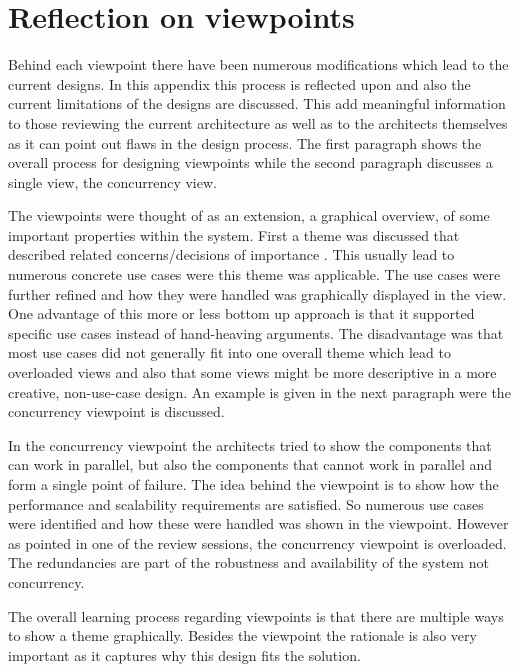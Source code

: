 \section{Reflection on viewpoints}

Behind each viewpoint there have been numerous modifications which lead to the current designs. In this appendix this process is reflected upon and also the current limitations of the designs are discussed. This add meaningful information to those reviewing the current architecture as well as to the architects themselves as it can point out flaws in the design process. The first paragraph shows the overall process for designing viewpoints while the second paragraph discusses a single view, the concurrency view. \newline

The viewpoints were thought of as an extension, a graphical overview, of some important properties within the system. First a theme was discussed that described related concerns/decisions of importance . This usually lead to numerous concrete use cases were this theme was applicable. The use cases were further refined and how they were handled was graphically displayed in the view. One advantage of this more or less bottom up approach is that it supported specific use cases instead of hand-heaving arguments. The disadvantage was that most use cases did not generally fit into one overall theme which lead to overloaded views and also that some views might be more descriptive in a more creative, non-use-case design. An example is given in the next paragraph were the concurrency viewpoint is discussed.\newline

In the concurrency viewpoint the architects tried to show the components that can work in parallel, but also the components that cannot work in parallel and form a single point of failure. The idea behind the viewpoint is to show how the performance and scalability requirements are satisfied. So numerous use cases were identified and how these were handled was shown in the viewpoint. However as pointed in one of the review sessions, the concurrency viewpoint is overloaded. The redundancies are part of the robustness and availability of the system not concurrency. \newline 

The overall learning process regarding viewpoints is that there are multiple ways to show a theme graphically. Besides the viewpoint the rationale is also very important as it captures why this design fits the solution.